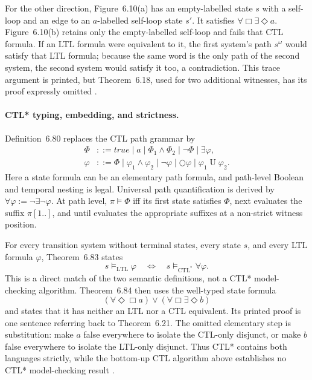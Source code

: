 For the other direction, Figure~6.10(a) has an empty-labelled state \(s\)
with a self-loop and an edge to an \(a\)-labelled self-loop state \(s'\).  It
satisfies \(\forall\Box\exists\Diamond a\).  Figure~6.10(b) retains only the
empty-labelled self-loop and fails that CTL formula.  If an LTL formula were
equivalent to it, the first system's path \(s^\omega\) would satisfy that LTL
formula; because the same word is the only path of the second system, the
second system would satisfy it too, a contradiction.  This trace argument is
printed, but Theorem~6.18, used for two additional witnesses, has its proof
expressly omitted \cite[pp.~334--340]{BaierKatoen2008}.

\paragraph{CTL* typing, embedding, and strictness.}
Definition~6.80 replaces the CTL path grammar by
\[
\begin{aligned}
 \Phi&::=true\mid a\mid\Phi_1\land\Phi_2\mid\neg\Phi\mid\exists\varphi,\\
 \varphi&::=\Phi\mid\varphi_1\land\varphi_2\mid\neg\varphi
             \mid\bigcirc\varphi\mid\varphi_1\mathbin{U}\varphi_2.
\end{aligned}
\]
Here a state formula can be an elementary path formula, and path-level Boolean
and temporal nesting is legal.  Universal path quantification is derived by
\(\forall\varphi:=\neg\exists\neg\varphi\).  At path level,
\(\pi\models\Phi\) iff its first state satisfies \(\Phi\), next evaluates
the suffix \(\pi[1..]\), and until evaluates the appropriate suffixes at a
non-strict witness position.

For every transition system without terminal states, every state \(s\), and
every LTL formula \(\varphi\), Theorem~6.83 states
\[
 s\models_{\mathrm{LTL}}\varphi
 \quad\Longleftrightarrow\quad
 s\models_{\mathrm{CTL}^*}\forall\varphi.
\]
This is a direct match of the two semantic definitions, not a CTL* model-
checking algorithm.  Theorem~6.84 then uses the well-typed state formula
\[
 (\forall\Diamond\Box a)\lor
 (\forall\Box\exists\Diamond b)
\]
and states that it has neither an LTL nor a CTL equivalent.  Its printed proof
is one sentence referring back to Theorem~6.21.  The omitted elementary step
is substitution: make \(a\) false everywhere to isolate the CTL-only
disjunct, or make \(b\) false everywhere to isolate the LTL-only disjunct.
Thus CTL* contains both languages strictly, while the bottom-up CTL algorithm
above establishes no CTL* model-checking result
\cite[defs.~6.80--6.82 and thms.~6.83--6.84; pp.~422--425]{BaierKatoen2008}.

